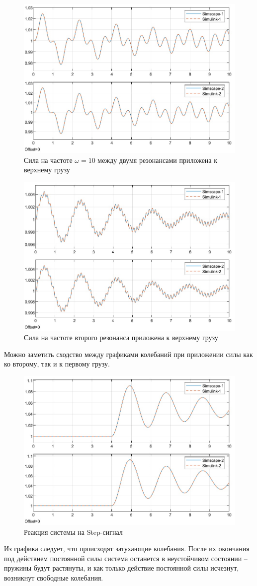 \documentclass{article}
\begin{document}
	\begin{figure}
		\centering
		\includegraphics[width=0.7\linewidth]{verx10}
		\caption{Сила на частоте $\omega = 10$ между двумя резонансами приложена к верхнему грузу}
		\label{fig:verx10}
	\end{figure}
	\begin{figure}[H]
		\centering
		\includegraphics[width=0.7\linewidth]{verxr2}
		\caption{Сила на частоте второго резонанса приложена к верхнему грузу}
		\label{fig:verxr2}
	\end{figure}
	Можно заметить сходство между графиками колебаний при приложении силы как ко второму, так и к первому грузу.
	\begin{figure}[H]
		\centering
		\includegraphics[width=0.7\linewidth]{step}
		\caption{Реакция системы на Step-сигнал}
		\label{fig:step}
	\end{figure}
	Из графика следует, что происходят затухающие колебания. После их окончания под действием постоянной силы система останется в неустойчивом состоянии -- пружины будут растянуты, и как только действие постоянной силы исчезнут, возникнут свободные колебания.
\end{document}
